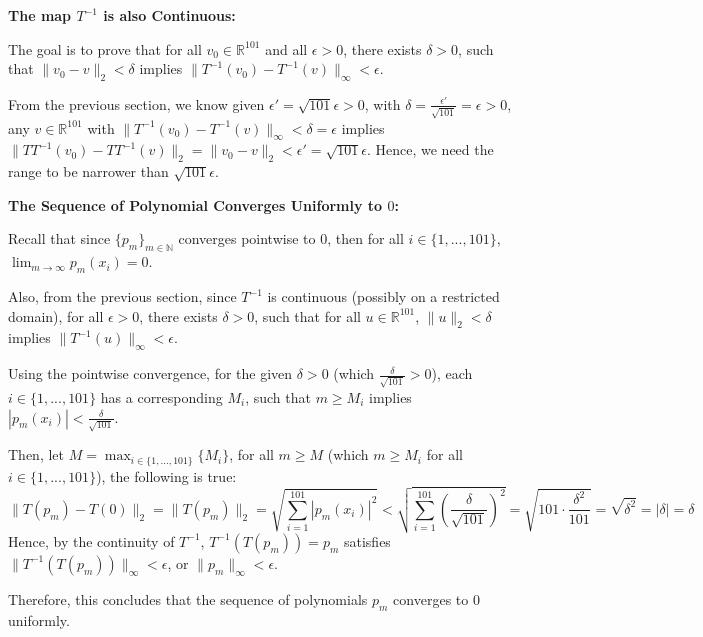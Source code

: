 \documentclass{article}
\begin{document}
\begin{itemize}
    \hfill

    \textbf{The map $T^{-1}$ is also Continuous:}

    The goal is to prove that for all $v_0\in\mathbb{R}^{101}$ and all $\epsilon>0$, there exists $\delta>0$, such that $\|v_0-v\|_2<\delta$ implies $\|T^{-1}(v_0)-T^{-1}(v)\|_\infty <\epsilon$.

    From the previous section, we know given $\epsilon' = \sqrt{101}\epsilon>0$, with $\delta = \frac{\epsilon'}{\sqrt{101}} = \epsilon>0$, any $v\in\mathbb{R}^{101}$ with $\|T^{-1}(v_0)-T^{-1}(v)\|_\infty<\delta = \epsilon$
    implies $\|TT^{-1}(v_0)-TT^{-1}(v)\|_2 = \|v_0-v\|_2 < \epsilon' = \sqrt{101}\epsilon$. Hence, we need the range to be narrower than $\sqrt{101}\epsilon$.


    \hfill

    \textbf{The Sequence of Polynomial Converges Uniformly to $0$:}

    Recall that since $\{p_m\}_{m\in\mathbb{N}}$ converges pointwise to $0$, then for all $i\in\{1,...,101\}$, $\lim_{m\rightarrow\infty}p_m(x_i)=0$.

    Also, from the previous section, since $T^{-1}$ is continuous (possibly on a restricted domain), for all $\epsilon>0$, there exists $\delta>0$, such that for all $u\in\mathbb{R}^{101}$, $\|u\|_2<\delta$ implies $\|T^{-1}(u)\|_\infty<\epsilon$.

    \hfill

    Using the pointwise convergence, for the given $\delta>0$ (which $\frac{\delta}{\sqrt{101}}>0$), each $i\in\{1,...,101\}$ has a corresponding $M_i$, such that $m\geq M_i$ implies $|p_m(x_i)|<\frac{\delta}{\sqrt{101}}$.

    Then, let $M = \max_{i\in\{1,...,101\}}\{M_i\}$, for all $m\geq M$ (which $m\geq M_i$ for all $i\in\{1,...,101\}$), the following is true:
    $$\|T(p_m)-T(0)\|_2 = \|T(p_m)\|_2 = \sqrt{\sum_{i=1}^{101}|p_m(x_i)|^2} < \sqrt{\sum_{i=1}^{101}\left(\frac{\delta}{\sqrt{101}}\right)^2} = \sqrt{101\cdot \frac{\delta^2}{101}} = \sqrt{\delta^2} = |\delta|=\delta$$
    Hence, by the continuity of $T^{-1}$, $T^{-1}(T(p_m)) = p_m$ satisfies $\|T^{-1}(T(p_m))\|_\infty < \epsilon$, or $\|p_m\|_\infty<\epsilon$.

    Therefore, this concludes that the sequence of polynomials $p_m$ converges to $0$ uniformly.
\end{itemize}
\end{document}
